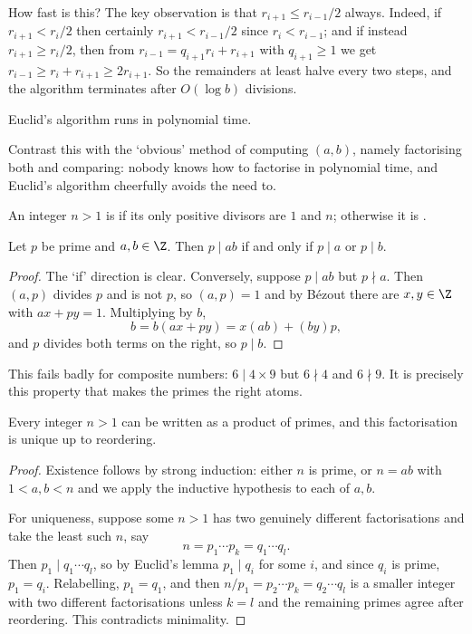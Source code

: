How fast is this? The key observation is that $r_{i+1} \leq r_{i-1}/2$ always. Indeed, if $r_{i+1} < r_i/2$ then certainly $r_{i+1} < r_{i-1}/2$ since $r_i < r_{i-1}$; and if instead $r_{i+1} \geq r_i/2$, then from $r_{i-1} = q_{i+1}r_i + r_{i+1}$ with $q_{i+1} \geq 1$ we get $r_{i-1} \geq r_i + r_{i+1} \geq 2r_{i+1}$. So the remainders at least halve every two steps, and the algorithm terminates after $O(\log b)$ divisions.

\begin{corollary}
	Euclid's algorithm runs in polynomial time.
\end{corollary}

Contrast this with the `obvious' method of computing $(a,b)$, namely factorising both and comparing: nobody knows how to factorise in polynomial time, and Euclid's algorithm cheerfully avoids the need to.

\begin{definition}
	An integer $n > 1$ is  if its only positive divisors are $1$ and $n$; otherwise it is .
\end{definition}

\begin{lemma}
	Let $p$ be prime and $a, b \in \Z$. Then $p \mid ab$ if and only if $p \mid a$ or $p \mid b$.
\end{lemma}
\begin{proof}
	The `if' direction is clear. Conversely, suppose $p \mid ab$ but $p \nmid a$. Then $(a, p)$ divides $p$ and is not $p$, so $(a,p) = 1$ and by Bézout there are $x, y \in \Z$ with $ax + py = 1$. Multiplying by $b$,
	$$
	b = b(ax + py) = x(ab) + (by)p,
	$$
	and $p$ divides both terms on the right, so $p \mid b$.
\end{proof}

This fails badly for composite numbers: $6 \mid 4 \times 9$ but $6 \nmid 4$ and $6 \nmid 9$. It is precisely this property that makes the primes the right atoms.

\begin{theorem}
	Every integer $n > 1$ can be written as a product of primes, and this factorisation is unique up to reordering.
\end{theorem}
\begin{proof}
	Existence follows by strong induction: either $n$ is prime, or $n = ab$ with $1 < a, b < n$ and we apply the inductive hypothesis to each of $a, b$.

	For uniqueness, suppose some $n > 1$ has two genuinely different factorisations and take the least such $n$, say
	$$
	n = p_1 \cdots p_k = q_1 \cdots q_l.
	$$
	Then $p_1 \mid q_1 \cdots q_l$, so by Euclid's lemma $p_1 \mid q_i$ for some $i$, and since $q_i$ is prime, $p_1 = q_i$. Relabelling, $p_1 = q_1$, and then $n/p_1 = p_2 \cdots p_k = q_2 \cdots q_l$ is a smaller integer with two different factorisations unless $k = l$ and the remaining primes agree after reordering. This contradicts minimality.
\end{proof}


